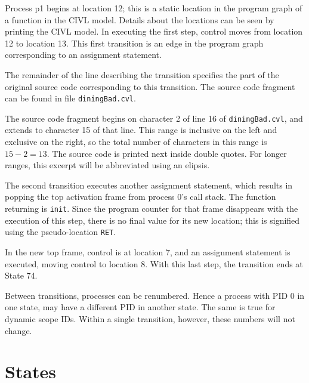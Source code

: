 Process p1 begins at location 12; this is a static location in the
program graph of a function in the CIVL model.  Details about the
locations can be seen by printing the CIVL model.  In executing the
first step, control moves from location 12 to location 13.  This first
transition is an edge in the program graph corresponding to an assignment
statement.

The remainder of the line describing the transition specifies the part of
the original source code corresponding to this transition.  The source code
fragment can be found in file \texttt{diningBad.cvl}.  

The source code fragment begins on character 2 of line 16 of
\texttt{diningBad.cvl}, and extends to character 15 of that line.  This range is
inclusive on the left and exclusive on the right, so the total number
of characters in this range is $15-2=13$.  The source code is 
printed next inside double quotes.  For longer
ranges, this excerpt will be abbreviated using an elipsis.

The second transition executes another assignment statement, which results in
popping the top activation frame from process 0's call stack. The
function returning is \texttt{init}.  Since the program counter for
that frame disappears with the execution of this step, there is no
final value for its new location; this is signified using the
pseudo-location \texttt{RET}.

In the new top frame, control is at location 7, and an assignment
statement is executed, moving control to location 8.  With this last
step, the transition ends at State 74.

Between transitions, processes can be renumbered.  Hence a process
with PID 0 in one state, may have a different PID in another state.
The same is true for dynamic scope IDs.  Within a single transition,
however, these numbers will not change.

\section{States}

